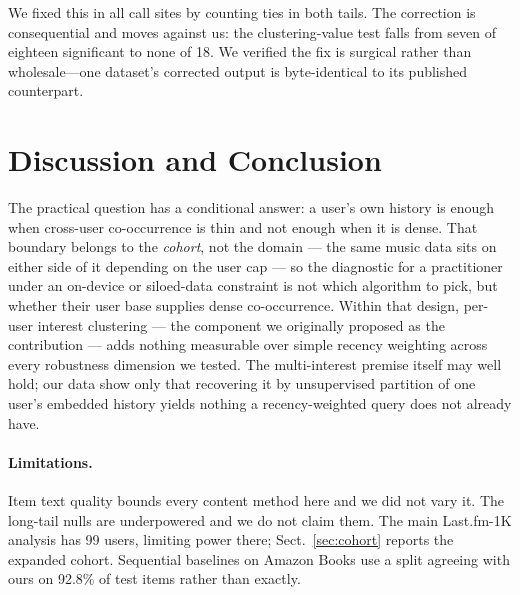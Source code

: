 \documentclass[runningheads,a4paper]{llncs}
\begin{document}
We fixed this in all call sites by counting ties in both tails. The correction is
consequential and moves against us: the clustering-value test falls from seven of eighteen
significant to none of 18. We verified the fix is surgical rather than
wholesale---one dataset's corrected output is byte-identical to its published counterpart.

\section{Discussion and Conclusion}

The practical question has a conditional answer: a user's own history is enough when
cross-user co-occurrence is thin and not enough when it is dense. That boundary belongs to
the \emph{cohort}, not the domain --- the same music data sits on either side of it
depending on the user cap --- so the diagnostic for a practitioner under an on-device or
siloed-data constraint is not which algorithm to pick, but whether their user base supplies
dense co-occurrence. Within that design, per-user interest clustering --- the component we
originally proposed as the contribution --- adds nothing measurable over simple recency
weighting across every robustness dimension we tested. The multi-interest premise itself may
well hold; our data show only that recovering it by unsupervised partition of one user's
embedded history yields nothing a recency-weighted query does not already have.

\paragraph{Limitations.} Item text quality bounds every content method here and we did not
vary it. The long-tail nulls are underpowered and we do not claim them. The main Last.fm-1K
analysis has 99 users, limiting power there; Sect.~\ref{sec:cohort} reports the expanded
cohort. Sequential baselines on Amazon Books use a split agreeing with ours on 92.8\% of
test items rather than exactly.
\end{document}
